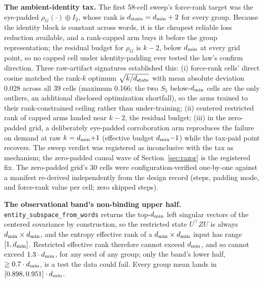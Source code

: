\textbf{The ambient-identity tax.} The first 58-cell sweep's force-rank
target was the eye-padded $\rho_G(\cdot) \oplus I_2$, whose rank is
$d_{\mathrm{state}} = d_{\min} + 2$ for every group.
Because the identity block is constant across words, it is the
cheapest reliable loss reduction available, and a rank-capped arm buys it
before the group representation; the residual budget for $\rho_G$ is
$k - 2$, below $d_{\min}$ at every grid point, so no capped cell under
identity-padding ever tested the law's confirm direction. Three raw-artifact
signatures established this: (i) force-rank cells' direct cosine matched
the rank-$k$ optimum $\sqrt{k/d_{\mathrm{state}}}$ with mean absolute deviation 0.028
across all 39 cells (maximum 0.166; the two $S_5$ below-$d_{\min}$ cells are
the only outliers, an additional disclosed optimization shortfall), so the
arms trained to their rank-constrained ceiling rather than under-training;
(ii) centered restricted rank of capped arms landed near $k - 2$, the
residual budget; (iii) in the zero-padded grid, a deliberately
eye-padded corroboration arm reproduces the failure on demand at raw
$k = d_{\min}{+}1$ (effective budget $d_{\min}{-}1$) while the tax-paid point
recovers.
The sweep verdict was registered as inconclusive with the tax as
mechanism; the zero-padded causal wave of Section~\ref{sec:razor} is
the registered fix.
The zero-padded grid's 30 cells were configuration-verified one-by-one
against a manifest re-derived independently from the design record (steps,
padding mode, and force-rank value per cell; zero skipped steps).

\textbf{The observational band's non-binding upper half.}
\texttt{entity\_subspace\_from\_words} returns the top-$d_{\min}$ left
singular vectors of the centered covariance by construction, so the
restricted state $U^{\top} Z U$ is always $d_{\min} \times d_{\min}$, and the
entropy effective rank of a $d_{\min} \times d_{\min}$ input has range
$[1, d_{\min}]$. Restricted effective rank therefore cannot exceed $d_{\min}$,
and so cannot exceed $1.3 \cdot d_{\min}$, for any seed of any group; only
the band's lower half, $\geq 0.7 \cdot d_{\min}$, is a test the data could
fail. Every group mean lands in $[0.898, 0.951] \cdot d_{\min}$.

